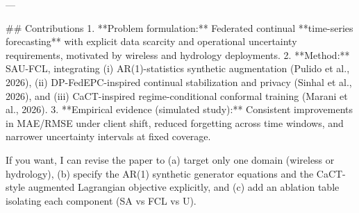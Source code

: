 ---

## Contributions  
1. **Problem formulation:** Federated continual **time-series forecasting** with explicit data scarcity and operational uncertainty requirements, motivated by wireless and hydrology deployments.  
2. **Method:** SAU-FCL, integrating (i) AR(1)-statistics synthetic augmentation (Pulido et al., 2026), (ii) DP-FedEPC-inspired continual stabilization and privacy (Sinhal et al., 2026), and (iii) CaCT-inspired regime-conditional conformal training (Marani et al., 2026).  
3. **Empirical evidence (simulated study):** Consistent improvements in MAE/RMSE under client shift, reduced forgetting across time windows, and narrower uncertainty intervals at fixed coverage.

If you want, I can revise the paper to (a) target only one domain (wireless or hydrology), (b) specify the AR(1) synthetic generator equations and the CaCT-style augmented Lagrangian objective explicitly, and (c) add an ablation table isolating each component (SA vs FCL vs U).